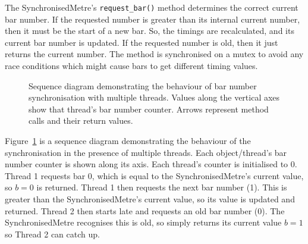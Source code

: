 \documentclass[12pt,twoside,openright]{report}
\begin{document}
The SynchronisedMetre's \verb'request_bar()' method determines the correct current bar
number. If the requested number is greater than its internal current number,
then it must be the start of a new bar. So, the timings are recalculated, and
its current bar number is updated. If the requested number is old, then it just
returns the current number. The method is synchronised on a mutex to avoid any
race conditions which might cause bars to get different timing values.

\usetikzlibrary{positioning}
\begin{figure}[ht]
    \centering
    \caption{Sequence diagram demonstrating the behaviour of bar number synchronisation with multiple threads. Values along the vertical axes show that thread's bar number counter. Arrows represent method calls and their return values.}
    \label{fig:multi-threading_sequence_diagram}
\end{figure}

Figure~\ref{fig:multi-threading_sequence_diagram} is a sequence diagram demonstrating the behaviour of the synchronisation
in the presence of multiple threads. Each object/thread's bar number counter is
shown along its axis. Each thread's counter is initialised to 0. Thread 1
requests bar 0, which is equal to the SynchronisedMetre's current value, so $b=0$
is returned. Thread 1 then requests the next bar number (1). This is greater
than the SynchronisedMetre's current value, so its value is updated and returned.
Thread 2 then starts late and requests an old bar number (0). The
SynchronisedMetre recognises this is old, so simply returns its current value
$b=1$ so Thread 2 can catch up.
\end{document}
